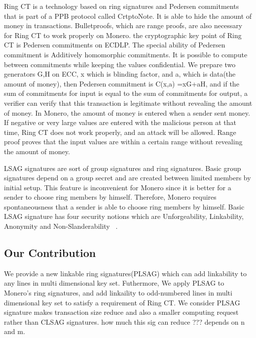     \qquad Ring CT is a technology based on ring signatures and Pedersen commitments that is part of a PPB protocol called CrtptoNote. It is able to hide the amount of money in transactions. Bulletproofs, which are range proofs, are also necessary for Ring CT to work properly on Monero. the cryptographic key point of Ring CT is Pedersen commitments on ECDLP. The special ability of Pedersen commitment is Additively homomorphic commitments. It is possible to compute between commitments while keeping the values confidential. We prepare two generators G,H on ECC, x which is blinding factor, and a, which is data(the amount of money), then Pedersen commitment is C(x,a) =xG+aH, and if the sum of commitments for input is equal to the sum of commitments for output, a verifier can verify that this transaction is legitimate without revealing the amount of money. In Monero, the amount of money is entered when a sender sent money. If negative or very large values are entered with the malicious person at that time, Ring CT does not work properly, and an attack will be allowed. Range proof proves that the input values are within a certain range without revealing the amount of money.
    
    \qquad LSAG signatures are sort of group signatures and ring signatures. Basic group signatures depend on a group secret and are created between limited members by initial setup. This feature is inconvenient for Monero since it is better for a sender to choose ring members by himself. Therefore, Monero requires spontaneousness that a sender is able to choose ring members by himself. Basic LSAG signature has four security notions which are Unforgeability, Linkability, Anonymity and Non-Slanderability ~\cite{Non-Slanderability}.
    
\subsection{Our Contribution}
    We provide a new linkable ring signatures(PLSAG) which can add linkability to any lines in multi dimensional key set. Futhermore, We apply PLSAG to Monero's ring signatures, and add linkaility to odd-numbered lines in multi dimensional key set to satisfy a requirement of Ring CT. We consider PLSAG signature makes transaction size reduce and also a smaller computing request rather than CLSAG signatures. how much this sig can reduce ??? depends on n and m.

